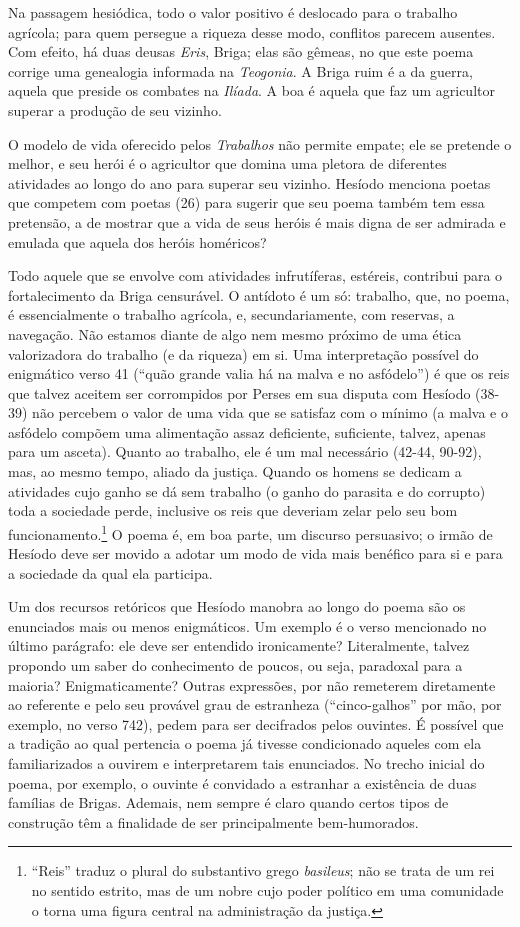 Na passagem hesiódica, todo o valor positivo é deslocado para o trabalho
agrícola; para quem persegue a riqueza desse modo, conflitos parecem
ausentes. Com efeito, há duas deusas \emph{Eris}, Briga; elas são
gêmeas, no que este poema corrige uma genealogia informada na
\emph{Teogonia}. A Briga ruim é a da guerra, aquela que preside os
combates na \emph{Ilíada}. A boa é aquela que faz um agricultor superar
a produção de seu vizinho.

O modelo de vida oferecido pelos \emph{Trabalhos} não permite empate;
ele se pretende o melhor, e seu herói é o agricultor que domina uma
pletora de diferentes atividades ao longo do ano para superar seu
vizinho. Hesíodo menciona poetas que competem com poetas (26) para
sugerir que seu poema também tem essa pretensão, a de mostrar que a vida
de seus heróis é mais digna de ser admirada e emulada que aquela dos
heróis homéricos?

Todo aquele que se envolve com atividades infrutíferas, estéreis,
contribui para o fortalecimento da Briga censurável. O antídoto é um só:
trabalho, que, no poema, é essencialmente o trabalho agrícola, e,
secundariamente, com reservas, a navegação. Não estamos diante de algo
nem mesmo próximo de uma ética valorizadora do trabalho (e da riqueza)
em si. Uma interpretação possível do enigmático verso 41 (``quão grande
valia há na malva e no asfódelo'') é que os reis que talvez aceitem ser
corrompidos por Perses em sua disputa com Hesíodo (38-39) não percebem o
valor de uma vida que se satisfaz com o mínimo (a malva e o asfódelo
compõem uma alimentação assaz deficiente, suficiente, talvez, apenas
para um asceta). Quanto ao trabalho, ele é um mal necessário (42-44,
90-92), mas, ao mesmo tempo, aliado da justiça. Quando os homens se
dedicam a atividades cujo ganho se dá sem trabalho (o ganho do parasita
e do corrupto) toda a sociedade perde, inclusive os reis que deveriam
zelar pelo seu bom funcionamento.\footnote{``Reis'' traduz o plural do
  substantivo grego \emph{basileus}; não se trata de um rei no sentido
  estrito, mas de um nobre cujo poder político em uma comunidade o torna
  uma figura central na administração da justiça.} O poema é, em boa
parte, um discurso persuasivo; o irmão de Hesíodo deve ser movido a
adotar um modo de vida mais benéfico para si e para a sociedade da qual
ela participa.

Um dos recursos retóricos que Hesíodo manobra ao longo do poema são os
enunciados mais ou menos enigmáticos. Um exemplo é o verso mencionado no
último parágrafo: ele deve ser entendido ironicamente? Literalmente,
talvez propondo um saber do conhecimento de poucos, ou seja, paradoxal
para a maioria? Enigmaticamente? Outras expressões, por não remeterem
diretamente ao referente e pelo seu provável grau de estranheza
(``cinco-galhos'' por mão, por exemplo, no verso 742), pedem para ser
decifrados pelos ouvintes. É possível que a tradição ao qual pertencia o
poema já tivesse condicionado aqueles com ela familiarizados a ouvirem e
interpretarem tais enunciados. No trecho inicial do poema, por exemplo,
o ouvinte é convidado a estranhar a existência de duas famílias de
Brigas. Ademais, nem sempre é claro quando certos tipos de construção
têm a finalidade de ser principalmente bem-humorados.

